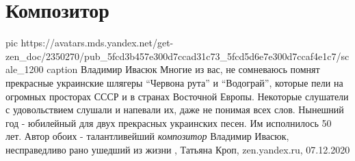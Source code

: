  
 
 
 
 
\chapter{Композитор}

\ifcmt
  pic https://avatars.mds.yandex.net/get-zen_doc/2350270/pub_5fcd3b457e300d7ccad31c73_5fcd5d6e7e300d7ccaf4e1c7/scale_1200
	caption Владимир Ивасюк
\fi
Многие из вас, не сомневаюсь помнят прекрасные украинские шлягеры \enquote{Червона
рута} и \enquote{Водограй}, которые пели на огромных просторах СССР и в странах
Восточной Европы. Некоторые слушатели с удовольствием слушали и напевали их,
даже не понимая всех слов.  Нынешний год - юбилейный для двух прекрасных
украинских песен. Им исполнилось 50 лет. Автор обоих - талантливейший
\emph{композитор} Владимир Ивасюк, несправедливо рано ушедший из жизни 
, 
Татьяна Кроп, zen.yandex.ru, 07.12.2020

